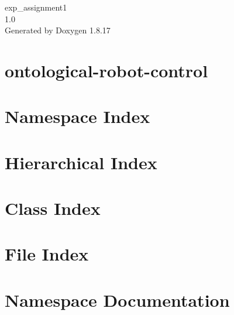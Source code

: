 \let\mypdfximage\pdfximage\def\pdfximage{\immediate\mypdfximage}\documentclass[twoside]{book}
\newcommand{\+}{\discretionary{\mbox{\scriptsize$\hookleftarrow$}}{}{}}
\newcommand{\clearemptydoublepage}{%
  \newpage{\pagestyle{empty}\cleardoublepage}%
}
\begin{document}
\hypersetup{pageanchor=false,
             bookmarksnumbered=true,
             pdfencoding=unicode
            }
\begin{titlepage}
\vspace*{7cm}
\begin{center}%
{\Large exp\+\_\+assignment1 \\[1ex]\large 1.\+0 }\\
\vspace*{1cm}
{\large Generated by Doxygen 1.8.17}\\
\end{center}
\end{titlepage}
\clearemptydoublepage
{}
\tableofcontents
\clearemptydoublepage
{}
\hypersetup{pageanchor=true}

\chapter{ontological-\/robot-\/control}
\label{md__r_e_a_d_m_e}

\chapter{Namespace Index}

\chapter{Hierarchical Index}

\chapter{Class Index}

\chapter{File Index}

\chapter{Namespace Documentation}

















\end{document}
